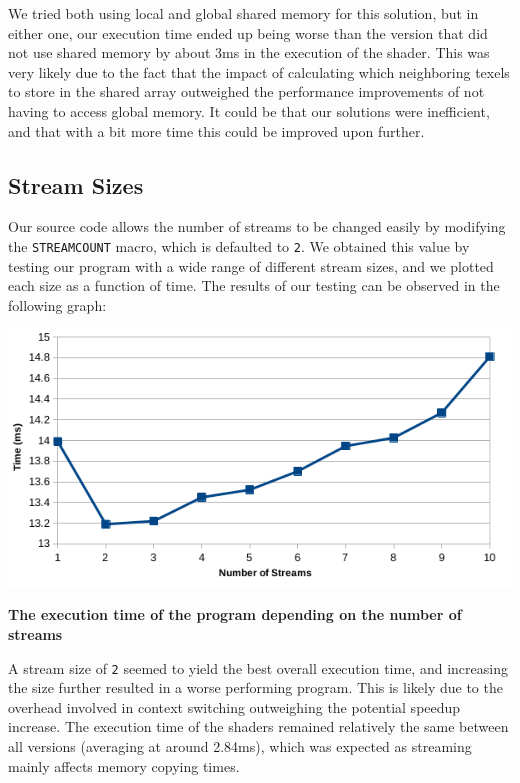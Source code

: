 \documentclass[10pt,journal,compsoc]{IEEEtran}
\def\code#1{\texttt{#1}}
\begin{document}
\noindent We tried both using local and global shared memory for this solution, but in either one, our execution time ended up being worse than the version that did not use shared memory by about 3ms in the execution of the shader. This was very likely due to the fact that the impact of calculating which neighboring texels to store in the shared array outweighed the performance improvements of not having to access global memory. It could be that our solutions were inefficient, and that with a bit more time this could be improved upon further. \\


\subsection{Stream Sizes}

\noindent Our source code allows the number of streams to be changed easily by modifying the \code{STREAMCOUNT} macro, which is defaulted to \code{2}. We obtained this value by testing our program with a wide range of different stream sizes, and we plotted each size as a function of time. The results of our testing can be observed in the following graph:

\begin{center}
  \captionsetup{type=figure}
  \includegraphics[width=\linewidth]{streamnumber.png}
  \caption {\textbf{The execution time of the program depending on the number of streams}}
  \label{fig:streamnumber}
\end{center}

\noindent A stream size of \code{2} seemed to yield the best overall execution time, and increasing the size further resulted in a worse performing program. This is likely due to the overhead involved in context switching outweighing the potential speedup increase. The execution time of the shaders remained relatively the same between all versions (averaging at around 2.84ms), which was expected as streaming mainly affects memory copying times. \\
\end{document}
